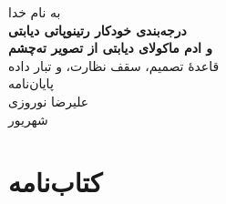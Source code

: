 \documentclass[12pt,a4paper,oneside]{report}
\newcommand{\num}[1]{\LR{#1}}
\begin{document}
\begin{titlepage}
\centering
\vspace*{2cm}
{\Large به نام خدا}\\[2.5cm]
{\huge\bfseries درجه‌بندی خودکار رتینوپاتی دیابتی\\[0.4em]
و ادم ماکولای دیابتی از تصویر ته‌چشم}\\[1.2em]
{\Large قاعدهٔ تصمیم، سقف نظارت، و تبار داده}\\[3cm]
{\large پایان‌نامه}\\[2.5cm]
{\large علیرضا نوروزی}\\[1cm]
{\large شهریور \num{۱۴۰۵}}
\vfill
\end{titlepage}

\cleardoublepage
{}




\tableofcontents
\cleardoublepage
\listoftables
\cleardoublepage

\cleardoublepage
{}








\cleardoublepage
{}
\chapter*{کتاب‌نامه}
\makeatletter
\renewenvironment{thebibliography}[1]
  {\list{\@biblabel{\@arabic\c@enumiv}}%
     {\settowidth\labelwidth{\@biblabel{#1}}%
      \leftmargin\labelwidth \advance\leftmargin\labelsep
      \@openbib@code \usecounter{enumiv}\let\p@enumiv\@empty
      \renewcommand\theenumiv{\@arabic\c@enumiv}}%
   \sloppy\clubpenalty4000\widowpenalty4000\sfcode`\.\@m}
  {\def\@noitemerr{\@latex@warning{Empty bibliography}}\endlist}
\makeatother
\begin{latin}


\end{latin}
\end{document}
